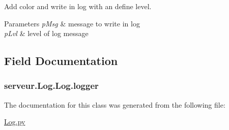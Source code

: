 Add color and write in log with an define level. 


\begin{DoxyParams}{Parameters}
{\em p\+Msg} & message to write in log \\
\hline
{\em p\+Lvl} & level of log message \\
\hline
\end{DoxyParams}


\subsection{Field Documentation}
\hypertarget{classserveur_1_1_log_1_1_log_a6d5e880653285603a27323c4d732c9a7}{}
\subsubsection[{logger}]{\setlength{\rightskip}{0pt plus 5cm}serveur.\+Log.\+Log.\+logger}\label{classserveur_1_1_log_1_1_log_a6d5e880653285603a27323c4d732c9a7}


The documentation for this class was generated from the following file\+:\begin{DoxyCompactItemize}
\item 
\hyperlink{_log_8py}{Log.\+py}\end{DoxyCompactItemize}
